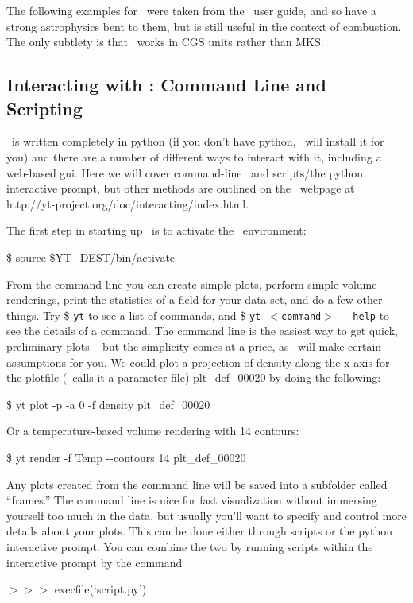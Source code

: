 The following examples for \yt\ were taken from the \castro\ user guide,
and so have a strong astrophysics bent to them, but is still useful
in the context of combustion.  The only subtlety is that \castro\ 
works in CGS units rather than MKS.

\subsection{Interacting with \yt: Command Line and Scripting}

\yt\ is written completely in python (if you don't have python, \yt\ will
install it for you) and there are a number of different ways to
interact with it, including a web-based gui. Here we will cover
command-line \yt\ and scripts/the python interactive prompt, but other
methods are outlined on the \yt\ webpage at
http://yt-project.org/doc/interacting/index.html.

The first step in starting up \yt\ is to activate the \yt\ environment:

\$ source \$YT\_DEST/bin/activate

From the command line you can create simple plots, perform simple
volume renderings, print the statistics of a field for your data set,
and do a few other things. Try {\$ \tt yt} to see a list of commands,
and {\$ \tt yt {\footnotesize$<$}command{\footnotesize$>$} -{}-help}
to see the details of a command. The command line is the easiest way
to get quick, preliminary plots -- but the simplicity comes at a
price, as \yt\ will make certain assumptions for you. We could plot a
projection of density along the x-axis for the plotfile (\yt\ calls it a
parameter file) plt\_def\_00020 by doing the following:

\$ yt plot -p -a 0 -f density plt\_def\_00020

Or a temperature-based volume rendering with 14 contours:

\$ yt render -f Temp -{}-contours 14 plt\_def\_00020

Any plots created from the command line will be saved into a
subfolder called ``frames.'' The command line is nice for fast
visualization without immersing yourself too much in the data, but
usually you'll want to specify and control more details about your
plots. This can be done either through scripts or the python
interactive prompt. You can combine the two by running scripts within
the interactive prompt by the command

{\scriptsize$>>>$} execfile(`script.py')

